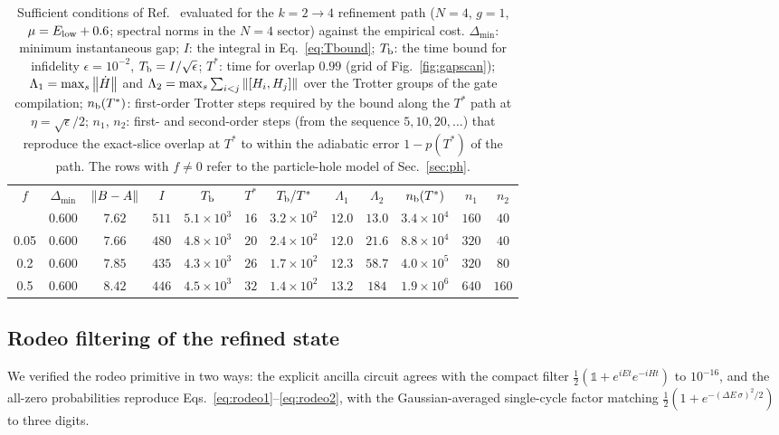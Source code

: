 \documentclass[
  aps,            %
  prc,            %
  reprint,        %
  superscriptaddress,
  floatfix,
  nofootinbib
]{revtex4-2}
\begin{document}
\begin{table}[t]
\caption{\label{tab:bound}Sufficient conditions of Ref.~\cite{Sadia2026}
evaluated for the $k=2\to4$ refinement path ($N=4$, $g=1$,
$\mu=E_{\rm low}+0.6$; spectral norms in the $N=4$ sector) against the
empirical cost.  $\Delta_{\min}$: minimum instantaneous gap; $I$: the
integral in Eq.~\eqref{eq:Tbound}; $T_{\rm b}$: the time bound for infidelity
$\epsilon=10^{-2}$, $T_{\rm b}=I/\sqrt{\epsilon}$; $T^{*}$: time for overlap
$0.99$ (grid of Fig.~\ref{fig:gapscan}); $\Lambda_1=\max_s\norm{\dot H}$ and
$\Lambda_2=\max_s\sum_{i<j}\norm{[H_i,H_j]}$ over the Trotter groups of the
gate compilation; $n_{\rm b}(T^{*})$: first-order Trotter steps required by
the bound along the $T^{*}$ path at $\eta=\sqrt{\epsilon}/2$; $n_1$, $n_2$:
first- and second-order steps (from the sequence $5,10,20,\ldots$) that
reproduce the exact-slice overlap at $T^{*}$ to within the adiabatic error
$1-p(T^{*})$ of the path.  The rows with $f\neq0$ refer to the particle-hole
model of Sec.~\ref{sec:ph}.}
\begin{ruledtabular}
\begin{tabular}{cccccccccccc}
$f$ & $\Delta_{\min}$ & $\norm{B-A}$ & $I$ & $T_{\rm b}$ & $T^{*}$ & $T_{\rm b}/T^{*}$ & $\Lambda_1$ & $\Lambda_2$ & $n_{\rm b}(T^{*})$ & $n_1$ & $n_2$\\
\colrule
0    & $0.600$ & $7.62$ & $511$ & $5.1\times10^{3}$ & $16$ & $3.2\times10^{2}$ & $12.0$ & $13.0$ & $3.4\times10^{4}$ & $160$ & $40$\\
0.05 & $0.600$ & $7.66$ & $480$ & $4.8\times10^{3}$ & $20$ & $2.4\times10^{2}$ & $12.0$ & $21.6$ & $8.8\times10^{4}$ & $320$ & $40$\\
0.2  & $0.600$ & $7.85$ & $435$ & $4.3\times10^{3}$ & $26$ & $1.7\times10^{2}$ & $12.3$ & $58.7$ & $4.0\times10^{5}$ & $320$ & $80$\\
0.5  & $0.600$ & $8.42$ & $446$ & $4.5\times10^{3}$ & $32$ & $1.4\times10^{2}$ & $13.2$ & $184$  & $1.9\times10^{6}$ & $640$ & $160$\\
\end{tabular}
\end{ruledtabular}
\end{table}

\subsection{Rodeo filtering of the refined state}
\label{sec:res-rodeo}
We verified the rodeo primitive in two ways: the explicit ancilla circuit agrees with
the compact filter $\tfrac12(\mathbb{1}+e^{iEt}e^{-iHt})$ to $10^{-16}$, and the
all-zero probabilities reproduce Eqs.~\eqref{eq:rodeo1}--\eqref{eq:rodeo2}, with the
Gaussian-averaged single-cycle factor matching $\tfrac12(1+e^{-(\Delta E\,\sigma)^2/2})$
to three digits.
\end{document}

